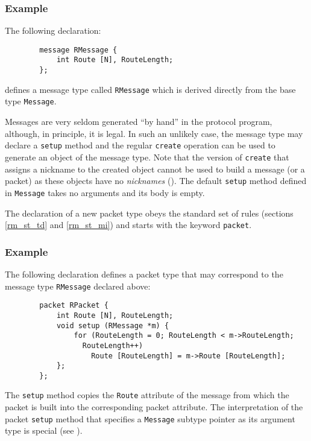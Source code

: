 \subsubsection*{Example}

\noindent
The following declaration:
\begin{verbatim}
        message RMessage {
            int Route [N], RouteLength;
        };
\end{verbatim}
defines a message type called {\tt RMessage} which is derived directly from
the base type {\tt Message}.

\medskip

\noindent
Messages are very seldom generated ``by hand'' in the protocol program,
although, in principle, it is legal.
In such an unlikely case, the message type may declare a {\tt setup} method
and the regular {\tt create} operation can be used to generate an object
of the message type.
Note that the version of {\tt create} that assigns a nickname to the created
object cannot be used to build a message (or a packet) as
these objects have no {\em nicknames} ().
The default {\tt setup} method defined in {\tt Message} takes no arguments
and its body is empty.

The declaration of a new packet type obeys the standard set of rules
(sections \ref{rm_st_td} and \ref{rm_st_mi}) and
starts with the keyword {\tt packet}.

\subsubsection*{Example}

\noindent
The following declaration defines a packet type that may correspond to the
message type {\tt RMessage} declared above:
\begin{verbatim}
        packet RPacket {
            int Route [N], RouteLength;
            void setup (RMessage *m) {
                for (RouteLength = 0; RouteLength < m->RouteLength;
                  RouteLength++)
                    Route [RouteLength] = m->Route [RouteLength];
            };
        };
\end{verbatim}
The {\tt setup} method copies the {\tt Route} attribute of the message
from which the packet is built into the corresponding packet attribute.
The interpretation of the packet {\tt setup} method
that specifies a {\tt Message} subtype pointer as its argument type is
special (see ).

\medskip

